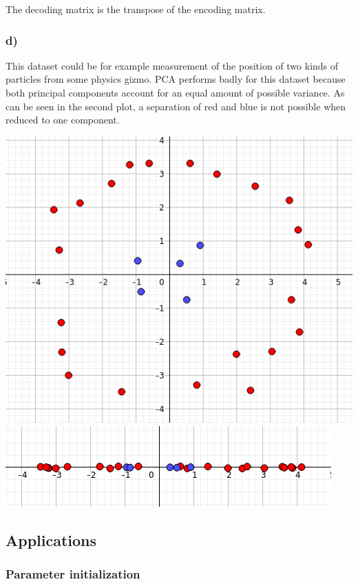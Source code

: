 \documentclass{article}
\begin{document}
The decoding matrix is the transpose of the encoding matrix.

\subsubsection*{d)}

This dataset could be for example measurement of the position of two kinds of particles from some physics gizmo.
PCA performs badly for this dataset because both principal components account for an equal amount of possible variance. As can be seen in the second plot, a separation of red and blue is not possible when reduced to one component.
\begin{center}
    \includegraphics[width=0.85\linewidth]{img/fig4.png}
    \includegraphics[width=0.85\linewidth]{img/fig4_squeezed.png}
\end{center}

\subsection{Applications}

\subsubsection{Parameter initialization}
\end{document}
